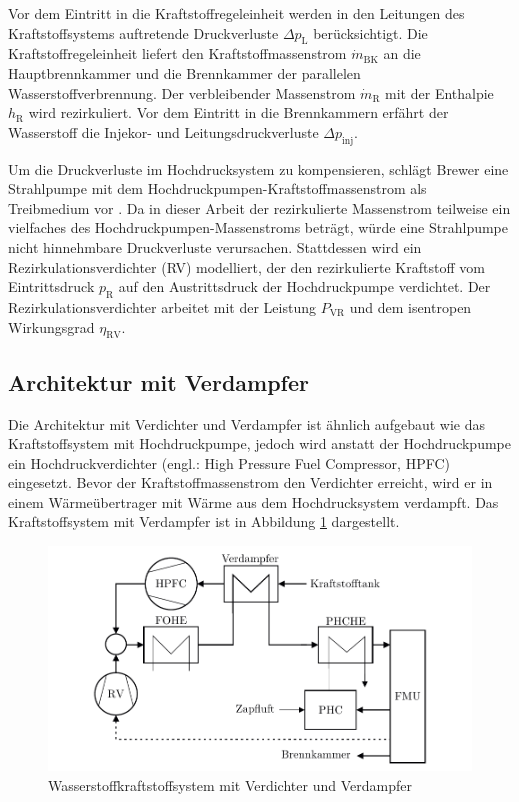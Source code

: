 Vor dem Eintritt in die Kraftstoffregeleinheit werden in den Leitungen des Kraftstoffsystems auftretende Druckverluste $\Delta p_\mathrm{L}$  berücksichtigt. Die Kraftstoffregeleinheit liefert den Kraftstoffmassenstrom $\dot{m}_{\mathrm{BK}}$ an die Hauptbrennkammer und die Brennkammer der parallelen Wasserstoffverbrennung. Der verbleibender Massenstrom $\dot{m}_\mathrm{R}$ mit der Enthalpie $h_\mathrm{R}$ wird rezirkuliert. Vor dem Eintritt in die Brennkammern erfährt der Wasserstoff die Injekor- und Leitungsdruckverluste $\Delta p_{\mathrm{inj}}$. 

Um die Druckverluste im Hochdrucksystem zu kompensieren, schlägt Brewer eine Strahlpumpe mit dem  Hochdruckpumpen-Kraftstoffmassenstrom als Treibmedium vor \cite{Brewer.1991}. Da in dieser Arbeit der rezirkulierte Massenstrom teilweise ein vielfaches des Hochdruckpumpen-Massenstroms beträgt, würde eine Strahlpumpe nicht hinnehmbare Druckverluste verursachen. Stattdessen wird ein Rezirkulationsverdichter (RV) modelliert, der den rezirkulierte Kraftstoff vom Eintrittsdruck $p_\mathrm{R}$ auf den Austrittsdruck der Hochdruckpumpe verdichtet. Der Rezirkulationsverdichter arbeitet mit der Leistung $P_\mathrm{VR}$ und dem isentropen Wirkungsgrad $\eta_\mathrm{RV}$. 

\subsection{Architektur mit Verdampfer}

Die Architektur mit Verdichter und Verdampfer ist ähnlich aufgebaut wie das Kraftstoffsystem mit Hochdruckpumpe, jedoch wird anstatt der Hochdruckpumpe ein Hochdruckverdichter (engl.: High Pressure Fuel Compressor, HPFC) eingesetzt. Bevor der Kraftstoffmassenstrom den Verdichter erreicht, wird er in einem Wärmeübertrager mit Wärme aus dem Hochdrucksystem verdampft. Das Kraftstoffsystem mit Verdampfer ist in Abbildung \ref{fig:verdampfer} dargestellt.

\begin{figure}[ht]
\centering
\includegraphics[width=1\linewidth]{4_Abbildungen/2_Hauptteil/Kraftstoffsystem Abbildungen/after.pdf}
  \caption{Wasserstoffkraftstoffsystem mit Verdichter und Verdampfer}
  \label{fig:verdampfer}
\end{figure}
\FloatBarrier 


